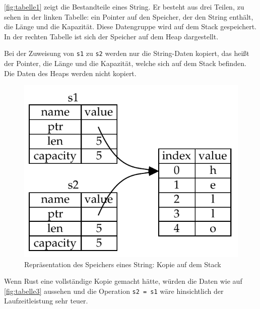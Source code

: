 \autoref{fig:tabelle1} zeigt die Bestandteile eines String. Er besteht aus drei Teilen, zu sehen in der linken Tabelle: ein Pointer auf den Speicher, der den String enthält, die Länge und die Kapazität. Diese Datengruppe wird auf dem Stack gespeichert. In der rechten Tabelle ist sich der Speicher auf dem Heap dargestellt.

Bei der Zuweisung von \verb"s1" zu \verb"s2" werden nur die String-Daten kopiert, das heißt der Pointer, die Länge und die Kapazität, welche sich auf dem Stack befinden. Die Daten des Heaps werden nicht kopiert.

\begin{figure}[htbp]
    \centering
    \includegraphics[scale=0.9]{Programmierung/Tabelle2.pdf}
    \caption{Repräsentation des Speichers eines String: Kopie auf dem Stack}
    \label{fig:tabelle2}
\end{figure}

Wenn Rust eine vollständige Kopie gemacht hätte, würden die Daten wie auf \autoref{fig:tabelle3} aussehen und die Operation \verb"s2 = s1" wäre hinsichtlich der Lauf\-zeit\-leis\-tung sehr teuer.

